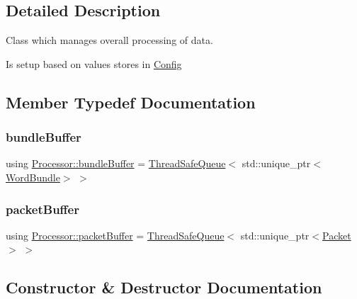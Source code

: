 \subsection{Detailed Description}
Class which manages overall processing of data. 

Is setup based on values stores in \hyperlink{class_config}{Config} 

\subsection{Member Typedef Documentation}
\mbox{\label{class_processor_a531b4c5f7c0d810fc6e9e1dd3d115725}} 
\subsubsection{\texorpdfstring{bundle\+Buffer}{bundleBuffer}}
{\footnotesize\ttfamily using \hyperlink{class_processor_a531b4c5f7c0d810fc6e9e1dd3d115725}{Processor\+::bundle\+Buffer} =  \hyperlink{class_thread_safe_queue}{Thread\+Safe\+Queue}$<$ std\+::unique\+\_\+ptr$<$\hyperlink{class_word_bundle}{Word\+Bundle}$>$ $>$\hspace{0.3cm}{\ttfamily [private]}}

\mbox{\label{class_processor_a0cfd8ed0721769db91c142a19a392e0f}} 
\subsubsection{\texorpdfstring{packet\+Buffer}{packetBuffer}}
{\footnotesize\ttfamily using \hyperlink{class_processor_a0cfd8ed0721769db91c142a19a392e0f}{Processor\+::packet\+Buffer} =  \hyperlink{class_thread_safe_queue}{Thread\+Safe\+Queue}$<$ std\+::unique\+\_\+ptr$<$\hyperlink{class_packet}{Packet}$>$ $>$\hspace{0.3cm}{\ttfamily [private]}}



\subsection{Constructor \& Destructor Documentation}
\mbox{\label{class_processor_a1cc4421ebb02f40665336598c1334c55}} 
